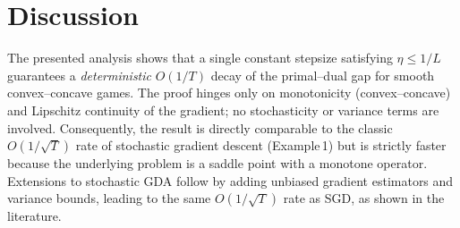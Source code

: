 \documentclass{article}
\begin{document}
\section*{Discussion}
The presented analysis shows that a single constant stepsize satisfying $\eta\le 1/L$ guarantees a \emph{deterministic} $O(1/T)$ decay of the primal–dual gap for smooth convex–concave games. The proof hinges only on monotonicity (convex–concave) and Lipschitz continuity of the gradient; no stochasticity or variance terms are involved. Consequently, the result is directly comparable to the classic $O(1/\sqrt{T})$ rate of stochastic gradient descent (Example 1) but is strictly faster because the underlying problem is a saddle point with a monotone operator. Extensions to stochastic GDA follow by adding unbiased gradient estimators and variance bounds, leading to the same $O(1/\sqrt{T})$ rate as SGD, as shown in the literature.
\end{document}
